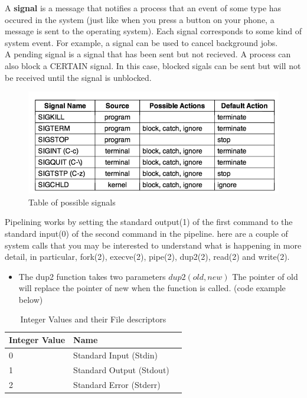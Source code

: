 A {\bf signal} is a message that notifies a process that an event of some type has occured in the system (just like when you press a button on your phone, a message is sent to the operating system).  Each signal corresponds to some kind of system event.  For example, a signal can be used to cancel background jobs.\\


A pending signal is a signal that has been sent but not recieved.  A process can also block a CERTAIN signal.  In this case, blocked sigals can be sent
but will not be received until the signal is unblocked.


\begin{figure}[H] %
\begin{center}
\includegraphics[width=0.5\linewidth]{./shell/signals}
\end{center}
\caption{Table of possible signals}
\label{fig:example_figure}
\end{figure}




Pipelining works by setting the standard output(1) of the first command to the standard input(0) of the second command in the pipeline.  
here are a couple of system calls that you may be interested to understand what is happening in more detail, in particular, fork(2), 
execve(2), pipe(2), dup2(2), read(2) and write(2).

\begin{itemize}
\item The dup2 function takes two parameters $dup2(old, new)$  The pointer of old will replace the pointer of new when the function is called. (code example below)
\end{itemize}

\begin{table}[H]
\begin{tabular}{l l l}
\toprule
\textbf{Integer Value} & \textbf{Name}  \\
\toprule
0 & Standard Input (Stdin)\\
1 & Standard Output (Stdout) \\
2 & Standard Error (Stderr) \\
\bottomrule
\end{tabular}
\caption{Integer Values and their File descriptors}
\label{tab:treatments_xy}
\end{table}


